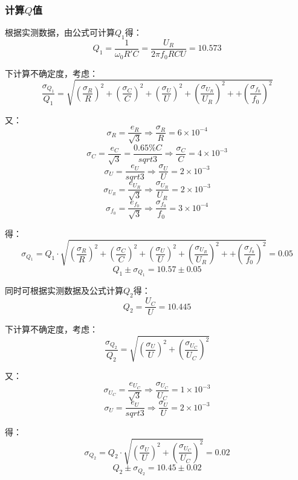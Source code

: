 \documentclass{ctexart}
\begin{document}
\subsubsection{计算$Q$值}
根据实测数据，由公式可计算$Q_1$得：
$$Q_1=\frac{1}{\omega_0R'C}=\frac{U_R}{2\pi f_0 R C U}=10.573$$

下计算不确定度，考虑：
$$\frac{\sigma_{Q_1}}{Q_1}=\sqrt{(\frac{\sigma_R}{R})^2+(\frac{\sigma_C}{C})^2+(\frac{\sigma_U}{U})^2+(\frac{\sigma_{U_R}}{U_R})^2++(\frac{\sigma_{f_0}}{f_0})^2}$$

又：
$$\sigma_R=\frac{e_R}{\sqrt{3}}\Rightarrow \frac{\sigma_R}{R}=6\times 10^{-4}$$
$$\sigma_C=\frac{e_C}{\sqrt{3}}=\frac{0.65\%C}{sqrt{3}}\Rightarrow\frac{\sigma_C}{C}=4\times10^{-3}$$
$$\sigma_U=\frac{e_U}{sqrt{3}}\Rightarrow\frac{\sigma_U}{U}=2\times10^{-3}$$
$$\sigma_{U_R}=\frac{e_{U_R}}{\sqrt{3}}\Rightarrow\frac{\sigma_{U_R}}{U_R}=2\times10^{-3}$$
$$\sigma_{f_0}=\frac{e_{f_0}}{\sqrt{3}}\Rightarrow\frac{\sigma_{f_0}}{f_0}=3\times10^{-4}$$

得：$$\sigma_{Q_1}=Q_1\cdot\sqrt{(\frac{\sigma_R}{R})^2+(\frac{\sigma_C}{C})^2+(\frac{\sigma_U}{U})^2+(\frac{\sigma_{U_R}}{U_R})^2++(\frac{\sigma_{f_0}}{f_0})^2}=0.05$$
$$Q_1\pm\sigma_{Q_1}=10.57\pm0.05$$

同时可根据实测数据及公式计算$Q_2$得：
$$Q_2=\frac{U_C}{U}=10.445$$

下计算不确定度，考虑：
$$\frac{\sigma_{Q_2}}{Q_2}=\sqrt{(\frac{\sigma_U}{U})^2+(\frac{\sigma_{U_C}}{U_C})^2}$$

又：
$$\sigma_{U_C}=\frac{e_{U_C}}{\sqrt{3}}\Rightarrow\frac{\sigma_{U_C}}{U_C}=1\times10^{-3}$$
$$\sigma_U=\frac{e_U}{sqrt{3}}\Rightarrow\frac{\sigma_U}{U}=2\times10^{-3}$$

得：
$$\sigma_{Q_2}=Q_2\cdot\sqrt{(\frac{\sigma_U}{U})^2+(\frac{\sigma_{U_C}}{U_C})^2}=0.02$$
$$Q_2\pm\sigma_{Q_2}=10.45\pm0.02$$
\end{document}
